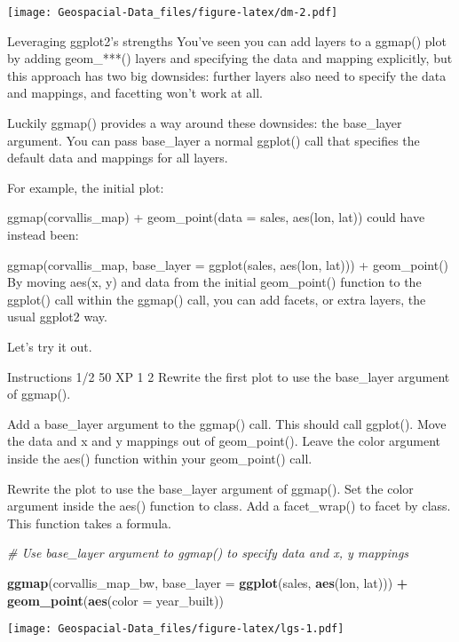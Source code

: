 \documentclass[]{article}
\newenvironment{Shaded}{\begin{snugshade}}{\end{snugshade}}
\newcommand{\CommentTok}[1]{\textcolor[rgb]{0.56,0.35,0.01}{\textit{#1}}}
\newcommand{\DataTypeTok}[1]{\textcolor[rgb]{0.13,0.29,0.53}{#1}}
\newcommand{\KeywordTok}[1]{\textcolor[rgb]{0.13,0.29,0.53}{\textbf{#1}}}
\newcommand{\NormalTok}[1]{#1}
\newcommand{\OperatorTok}[1]{\textcolor[rgb]{0.81,0.36,0.00}{\textbf{#1}}}
\newcommand{\StringTok}[1]{\textcolor[rgb]{0.31,0.60,0.02}{#1}}
\begin{document}
\texttt{[image: Geospacial-Data\_files/figure-latex/dm-2.pdf]}

Leveraging ggplot2's strengths You've seen you can add layers to a
ggmap() plot by adding geom\_***() layers and specifying the data and
mapping explicitly, but this approach has two big downsides: further
layers also need to specify the data and mappings, and facetting won't
work at all.

Luckily ggmap() provides a way around these downsides: the base\_layer
argument. You can pass base\_layer a normal ggplot() call that specifies
the default data and mappings for all layers.

For example, the initial plot:

ggmap(corvallis\_map) + geom\_point(data = sales, aes(lon, lat)) could
have instead been:

ggmap(corvallis\_map, base\_layer = ggplot(sales, aes(lon, lat))) +
geom\_point() By moving aes(x, y) and data from the initial
geom\_point() function to the ggplot() call within the ggmap() call, you
can add facets, or extra layers, the usual ggplot2 way.

Let's try it out.

Instructions 1/2 50 XP 1 2 Rewrite the first plot to use the base\_layer
argument of ggmap().

Add a base\_layer argument to the ggmap() call. This should call
ggplot(). Move the data and x and y mappings out of geom\_point(). Leave
the color argument inside the aes() function within your geom\_point()
call.

Rewrite the plot to use the base\_layer argument of ggmap(). Set the
color argument inside the aes() function to class. Add a facet\_wrap()
to facet by class. This function takes a formula.

\begin{Shaded}
\begin{Highlighting}[]
\CommentTok{# Use base_layer argument to ggmap() to specify data and x, y mappings}

  \KeywordTok{ggmap}\NormalTok{(corvallis_map_bw, }
    \DataTypeTok{base_layer =} \KeywordTok{ggplot}\NormalTok{(sales, }\KeywordTok{aes}\NormalTok{(lon, lat))) }\OperatorTok{+}
\StringTok{  }\KeywordTok{geom_point}\NormalTok{(}\KeywordTok{aes}\NormalTok{(}\DataTypeTok{color =}\NormalTok{ year_built))}
\end{Highlighting}
\end{Shaded}

\texttt{[image: Geospacial-Data\_files/figure-latex/lgs-1.pdf]}
\end{document}
